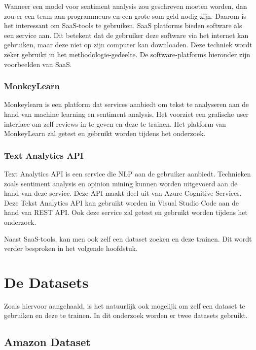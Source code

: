 Wanneer een model voor sentiment analysis zou geschreven moeten worden, dan zou er een team aan programmeurs en een grote som geld nodig zijn. Daarom is het interessant om SaaS-tools te gebruiken. SaaS platforms bieden software als een service aan. Dit betekent dat de gebruiker deze software via het internet kan gebruiken, maar deze niet op zijn computer kan downloaden. \autocite{Marketing2021} Deze techniek wordt zeker gebruikt in het methodologie-gedeelte. De software-platforms hieronder zijn voorbeelden van SaaS. 

\subsubsection{MonkeyLearn}
\label{monkeylearn}

Monkeylearn is een platform dat services aanbiedt om tekst te analyseren aan de hand van machine learning en sentiment analysis. Het voorziet een grafische user interface om zelf reviews in te geven en deze te trainen. \autocite{Maguire2021} Het platform van MonkeyLearn zal getest en gebruikt worden tijdens het onderzoek.

\subsubsection{Text Analytics API}
\label{textanalytics}

Text Analytics API is een service die NLP aan de gebruiker aanbiedt. Technieken zoals sentiment analysis en opinion mining kunnen worden uitgevoerd aan de hand van deze service. Deze API maakt deel uit van Azure Cognitive Services. \autocite{Microsoft2020} Deze Tekst Analytics API kan gebruikt worden in Visual Studio Code aan de hand van REST API. Ook deze service zal getest en gebruikt worden tijdens het onderzoek.

Naast SaaS-tools, kan men ook zelf een dataset zoeken en deze trainen. Dit wordt verder besproken in het volgende hoofdstuk.

\section{De Datasets}
\label{datasets} 

Zoals hiervoor aangehaald, is het natuurlijk ook mogelijk om zelf een dataset te gebruiken en deze te trainen. In dit onderzoek worden er twee datasets gebruikt.

\subsection{Amazon Dataset}
\label{amazon}

